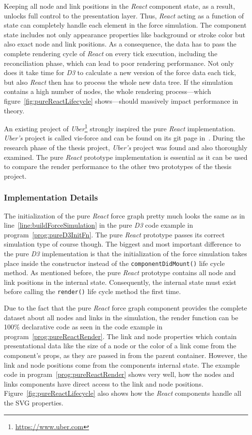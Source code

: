 Keeping all node and link positions in the \emph{React} component state, as a result, unlocks full control to the presentation layer. Thus, \emph{React} acting as a function of state can completely handle each element in the force simulation. The component state includes not only appearance properties like background or stroke color but also exact node and link positions. As a consequence, the data has to pass the complete rendering cycle of \emph{React} on every tick execution, including the reconciliation phase, which can lead to poor rendering performance. Not only does it take time for \emph{D3} to calculate a new version of the force data each tick, but also \emph{React} then has to process the whole new data tree. If the simulation contains a high number of nodes, the whole rendering process---which figure~\ref{fig:pureReactLifecycle} shows---should massively impact performance in theory.

An existing project of \emph{Uber}\footnote{\url{https://www.uber.com}} strongly inspired the pure \emph{React} implementation. \emph{Uber's} project is called vis-force and can be found on its git page in~\cite{UberVisForce}. During the research phase of the thesis project, \emph{Uber's} project was found and also thoroughly examined. The pure \emph{React} prototype implementation is essential as it can be used to compare the render performance to the other two prototypes of the thesis project.

\subsubsection{Implementation Details}

The initialization of the pure \emph{React} force graph pretty much looks the same as in line~\ref{line:buildForceSimulation} in the pure \emph{D3} code example in program~\ref{prog:pureD3InitFn}. The pure \emph{React} prototype passes its correct simulation type of course though. The biggest and most important difference to the pure \emph{D3} implementation is that the initialization of the force simulation takes place inside the constructor instead of the \texttt{componentDidMount()} life cycle method. As mentioned before, the pure \emph{React} prototype contains all node and link positions in the internal state. Consequently, the internal state must exist before calling the \texttt{render()} life cycle method the first time.

Due to the fact that the pure \emph{React} force graph component provides the complete dataset about all nodes and links in the simulation, the render function can be 100\% declarative code as seen in the code example in program~\ref{prog:pureReactRender}. The link and node properties which contain presentational data like the size of a node or the color of a link come from the component's props, as they are passed in from the parent container. However, the link and node positions come from the components internal state. The example code in program~\ref{prog:pureReactRender} shows very well, how the nodes and links components have direct access to the link and node positions. Figure~\ref{fig:pureReactLifecycle} also shows how the \emph{React} components handle all the SVG properties.

